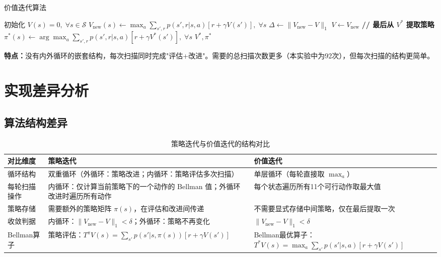 \documentclass[12pt,a4paper]{ctexart}
\begin{document}
\begin{algorithm}[H]
\caption{价值迭代算法}
\begin{algorithmic}[1]
\STATE 初始化 $V(s) = 0, \; \forall s \in \mathcal{S}$
\REPEAT
  \STATE $V_{\text{new}}(s) \leftarrow \max_a \sum_{s',r} p(s',r|s,a)[r + \gamma V(s')], \; \forall s$
  \STATE $\Delta \leftarrow \|V_{\text{new}} - V\|_1$
  \STATE $V \leftarrow V_{\text{new}}$
\UNTIL{$\Delta < \delta$}
\STATE \textbf{// 最后从 $V^*$ 提取策略}
\STATE $\pi^*(s) \leftarrow \arg\max_a \sum_{s',r} p(s',r|s,a)[r + \gamma V^*(s')], \; \forall s$
\RETURN $V^*, \pi^*$
\end{algorithmic}
\end{algorithm}

\textbf{特点：}没有内外循环的嵌套结构，每次扫描同时完成"评估+改进"。需要的总扫描次数更多（本实验中为92次），但每次扫描的结构更简单。

\section{实现差异分析}

\subsection{算法结构差异}

\begin{table}[H]
\centering
\caption{策略迭代与价值迭代的结构对比}
\begin{tabularx}{\textwidth}{l X X}
\toprule
\textbf{对比维度} & \textbf{策略迭代} & \textbf{价值迭代} \\
\midrule
循环结构 & 双重循环（外循环：策略改进；内循环：策略评估多次扫描） & 单层循环（每轮直接取 $\max_a$） \\
\midrule
每轮扫描操作 & 内循环：仅计算当前策略下的一个动作的 Bellman 值；外循环改进时遍历所有动作 & 每个状态遍历所有11个可行动作取最大值 \\
\midrule
策略存储 & 需要额外的策略矩阵 $\pi(s)$，在评估和改进间传递 & 不需要显式存储中间策略，仅在最后提取一次 \\
\midrule
收敛判据 & 内循环：$\|V_{\text{new}} - V\|_1 < \delta$；外循环：策略不再变化 & $\|V_{\text{new}} - V\|_1 < \delta$ \\
\midrule
Bellman算子 & 策略评估：$T^{\pi}V(s) = \sum_{s'} p(s'|s,\pi(s))[r + \gamma V(s')]$ & Bellman最优算子：$T^*V(s) = \max_a \sum_{s'} p(s'|s,a)[r + \gamma V(s')]$ \\
\bottomrule
\end{tabularx}
\end{table}
\end{document}

